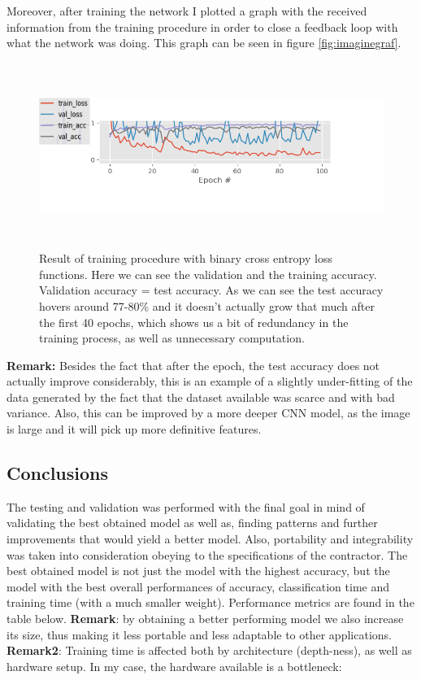 \documentclass[12pt,a4paper,twoside]{report}
\begin{document}
Moreover, after training the network I plotted a graph with the received information from the training procedure in order to close a feedback loop with what the network was doing. This graph can be seen in figure \ref{fig:imaginegraf}.
\begin{figure}[h!]
	\centering
	\includegraphics[width=15cm, height=6cm]{img/data/grafus.png}
	\caption[]
	{Result of training procedure with binary cross entropy loss functions. Here we can see the validation and the training accuracy. Validation accuracy = test accuracy. As we can see the test accuracy hovers around 77-80\% and it doesn't actually grow that much after the first 40 epochs, which shows us a bit of redundancy in the training process, as well as unnecessary computation.}
	\label{fig:grafus}
\end{figure}

\textbf{Remark:} Besides the fact that after the  epoch, the test accuracy does not actually improve considerably, this is an example of a slightly under-fitting of the data generated by the fact that the dataset available was scarce and with bad variance. Also, this can be improved by a more deeper CNN model, as the image is large and it will pick up more definitive features.



\subsection{Conclusions}
The testing and validation was performed with the final goal in mind of validating the best obtained model as well as, finding patterns and further improvements that would yield a better model. Also, portability and integrability was taken into consideration obeying to the specifications of the contractor. 
The best obtained model is not just the model with the highest accuracy, but the model with the best overall performances of accuracy, classification time and training time (with a much smaller weight).
Performance metrics are found in the table below. \textbf{Remark}: by obtaining a better performing model we also increase its size, thus making it less portable and less adaptable to other applications. \textbf{Remark2}: Training time is affected both by architecture (depth-ness), as well as hardware setup. In my case, the hardware available is a bottleneck:
\end{document}
